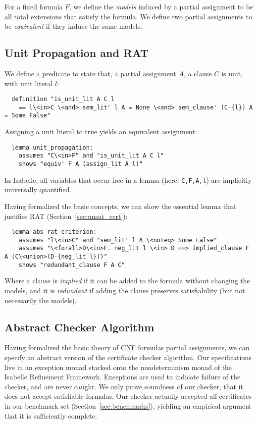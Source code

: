 \documentclass[smallcondensed]{svjour3}     %
\newcommand{\isai}{\lstinline[language=isabelle,basicstyle=\normalsize\ttfamily\slshape]}
\begin{document}
For a fixed formula $F$, we define the \emph{models} induced by a partial assignment to be all total extensions that satisfy the formula. 
We define two partial assignments to be \emph{equivalent} if they induce the same models.

\subsection{Unit Propagation and RAT}
We define a predicate to state that, \wrt a partial assignment $A$, a clause $C$ is unit, with unit literal $l$:
\begin{lstlisting}
  definition "is_unit_lit A C l 
    == l\<in>C \<and> sem_lit' l A = None \<and> sem_clause' (C-{l}) A = Some False"
\end{lstlisting}
Assigning a unit literal to true yields an equivalent assignment:
\begin{lstlisting}
  lemma unit_propagation:
    assumes "C\<in>F" and "is_unit_lit A C l"
    shows "equiv' F A (assign_lit A l)"
\end{lstlisting}
In Isabelle, all variables that occur free in a lemma (here: \isai{C,F,A,l}) are implicitly universally quantified.

Having formalized the basic concepts, we can show the essential lemma that justifies RAT (\cf Section~\ref{sec:unsat_cert}):
\begin{lstlisting}
  lemma abs_rat_criterion:
    assumes "l\<in>C" and "sem_lit' l A \<noteq> Some False"
    assumes "\<forall>D\<in>F. neg_lit l \<in> D ==> implied_clause F A (C\<union>(D-{neg_lit l}))"  
    shows "redundant_clause F A C"
\end{lstlisting}
Where a clause is \emph{implied} if it can be added to the formula without changing the models, 
and it is \emph{redundant} if adding the clause preserves satisfiability (but not necessarily the models).


% 
% 
% 

\subsection{Abstract Checker Algorithm}
Having formalized the basic theory of CNF formulas \wrt partial assignments, we can specify an abstract version of the certificate checker algorithm.
Our specifications live in an exception monad stacked onto the nondeterminism monad of the Isabelle Refinement Framework.
Exceptions are used to indicate failure of the checker, and are never caught.
%
We only prove soundness of our checker, \ie that it does not accept satisfiable formulas.
Our checker actually accepted all certificates in our benchmark set (\cf Section~\ref{sec:benchmarks}), yielding 
an empirical argument that it is sufficiently complete.
\end{document}
